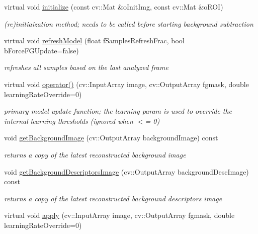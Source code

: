 \begin{DoxyCompactItemize}
virtual void \mbox{\hyperlink{class_background_subtractor_su_b_s_e_n_s_e_ac84aa66030b04a72435ef473cf0e6a3f}{initialize}} (const cv\+::\+Mat \&o\+Init\+Img, const cv\+::\+Mat \&o\+R\+OI)
\begin{DoxyCompactList}\small\item\em (re)initiaization method; needs to be called before starting background subtraction \end{DoxyCompactList}\item 
virtual void \mbox{\hyperlink{class_background_subtractor_su_b_s_e_n_s_e_abe80bf042f2b7a1f72942460d74b1f02}{refresh\+Model}} (float f\+Samples\+Refresh\+Frac, bool b\+Force\+F\+G\+Update=false)
\begin{DoxyCompactList}\small\item\em refreshes all samples based on the last analyzed frame \end{DoxyCompactList}\item 
virtual void \mbox{\hyperlink{class_background_subtractor_su_b_s_e_n_s_e_aaa60e2883c2b2cf130820b10104a653b}{operator()}} (cv\+::\+Input\+Array image, cv\+::\+Output\+Array fgmask, double learning\+Rate\+Override=0)
\begin{DoxyCompactList}\small\item\em primary model update function; the learning param is used to override the internal learning thresholds (ignored when $<$= 0) \end{DoxyCompactList}\item 
void \mbox{\hyperlink{class_background_subtractor_su_b_s_e_n_s_e_a04f6ee8e507bfc708b5b9b4ff97c16e0}{get\+Background\+Image}} (cv\+::\+Output\+Array background\+Image) const
\begin{DoxyCompactList}\small\item\em returns a copy of the latest reconstructed background image \end{DoxyCompactList}\item 
void \mbox{\hyperlink{class_background_subtractor_su_b_s_e_n_s_e_a1a6bc447dded20dcce887d7986109ea9}{get\+Background\+Descriptors\+Image}} (cv\+::\+Output\+Array background\+Desc\+Image) const
\begin{DoxyCompactList}\small\item\em returns a copy of the latest reconstructed background descriptors image \end{DoxyCompactList}\item 
virtual void \mbox{\hyperlink{class_background_subtractor_su_b_s_e_n_s_e_adc2a6761d618ea16861ee7a992c154f1}{apply}} (cv\+::\+Input\+Array image, cv\+::\+Output\+Array fgmask, double learning\+Rate\+Override=0)

\end{DoxyCompactItemize}
